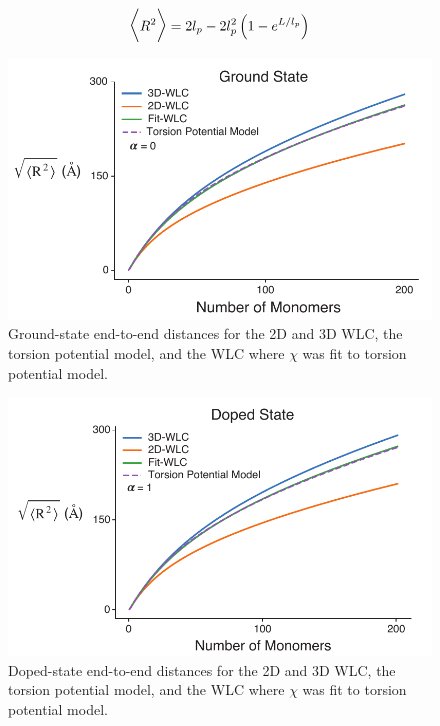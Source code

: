 \begin{equation}
\Large
\Big\langle R^2 \Big\rangle = 2l_p - 2l_p^2 \left(1 - e^{L/l_p} \right)
\label{eq:wlc_msqr}
\end{equation}

\begin{figure}[hbt!]
    \centering
    \includegraphics{figures/append_tor_model/gs_wlc_fit.pdf}
    \caption[Ground-state End-to-end Distance of the 2D-WLC, 3D-WLC, Torsion Potential Model, and Fit-WLC]{Ground-state end-to-end distances for the 2D and 3D WLC, the torsion potential model, and the WLC where $\chi$ was fit to torsion potential model.}
    \label{fig:gs_wlc}
\end{figure}

\begin{figure}[hbt!]
    \centering
    \includegraphics{figures/append_tor_model/cat_wlc_fit.pdf}
    \caption[Doped-state End-to-end Distance of the 2D-WLC, 3D-WLC, Torsion Potential Model, and Fit-WLC]{Doped-state end-to-end distances for the 2D and 3D WLC, the torsion potential model, and the WLC where $\chi$ was fit to torsion potential model.}
    \label{fig:d_wlc}
\end{figure}

